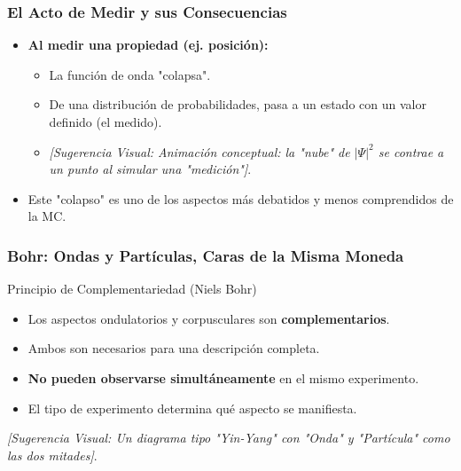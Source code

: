 \documentclass{beamer}
\begin{document}
	\begin{frame}
		\frametitle{El Acto de Medir y sus Consecuencias}
		\begin{itemize}
			\item \textbf{Al medir una propiedad (ej. posición):}
			\begin{itemize}
				\item La función de onda "colapsa".
				\item De una distribución de probabilidades, pasa a un estado con un valor definido (el medido).
				\item \textit{[Sugerencia Visual: Animación conceptual: la "nube" de $|\Psi|^2$ se contrae a un punto al simular una "medición"]}.
			\end{itemize} \pause
			\item Este "colapso" es uno de los aspectos más debatidos y menos comprendidos de la MC.
		\end{itemize}
	\end{frame}
	
	\begin{frame}
		\frametitle{Bohr: Ondas y Partículas, Caras de la Misma Moneda}
		\begin{block}{Principio de Complementariedad (Niels Bohr)}
			\begin{itemize}
				\item Los aspectos ondulatorios y corpusculares son \textbf{complementarios}.
				\item Ambos son necesarios para una descripción completa.
				\item \textbf{No pueden observarse simultáneamente} en el mismo experimento.
				\item El tipo de experimento determina qué aspecto se manifiesta.
			\end{itemize}
		\end{block}
		\pause
		\textit{[Sugerencia Visual: Un diagrama tipo "Yin-Yang" con "Onda" y "Partícula" como las dos mitades]}.
	\end{frame}
	
\end{document}
